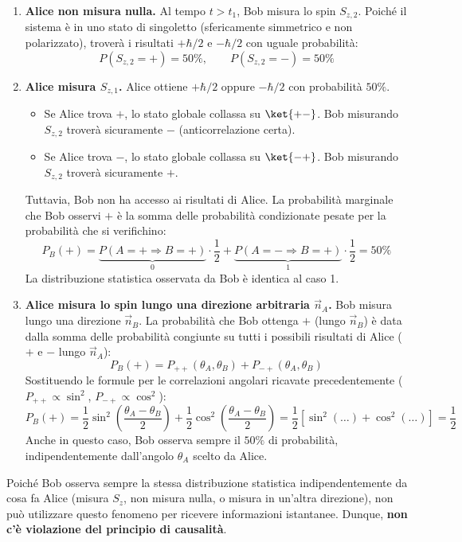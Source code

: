 \begin{enumerate}
    \item \textbf{Alice non misura nulla.}
    Al tempo $t > t_1$, Bob misura lo spin $S_{z,2}$. Poiché il sistema è in uno stato di singoletto (sfericamente simmetrico e non polarizzato), troverà i risultati $+\hbar/2$ e $-\hbar/2$ con uguale probabilità:
    \[
        P(S_{z,2} = +) = 50\%, \qquad P(S_{z,2} = -) = 50\%
    \]

    \item \textbf{Alice misura $S_{z,1}$.}
    Alice ottiene $+\hbar/2$ oppure $-\hbar/2$ con probabilità $50\%$.
    \begin{itemize}
        \item Se Alice trova $+$, lo stato globale collassa su $\ket{+-}$. Bob misurando $S_{z,2}$ troverà sicuramente $-$ (anticorrelazione certa).
        \item Se Alice trova $-$, lo stato globale collassa su $\ket{-+}$. Bob misurando $S_{z,2}$ troverà sicuramente $+$.
    \end{itemize}
    Tuttavia, Bob non ha accesso ai risultati di Alice. La probabilità marginale che Bob osservi $+$ è la somma delle probabilità condizionate pesate per la probabilità che si verifichino:
    \[
        P_B(+) = \underbrace{P(A=+ \Rightarrow B=+)}_{0} \cdot \frac{1}{2} + \underbrace{P(A=- \Rightarrow B=+)}_{1} \cdot \frac{1}{2} = 50\%
    \]
    La distribuzione statistica osservata da Bob è identica al caso 1.

    \item \textbf{Alice misura lo spin lungo una direzione arbitraria $\vec{n}_A$.}
    Bob misura lungo una direzione $\vec{n}_B$.
    La probabilità che Bob ottenga $+$ (lungo $\vec{n}_B$) è data dalla somma delle probabilità congiunte su tutti i possibili risultati di Alice ($+$ e $-$ lungo $\vec{n}_A$):
    \[
        P_B(+) = P_{++}(\theta_A, \theta_B) + P_{-+}(\theta_A, \theta_B)
    \]
    Sostituendo le formule per le correlazioni angolari ricavate precedentemente ($P_{++} \propto \sin^2$, $P_{-+} \propto \cos^2$):
    \[
        P_B(+) = \frac{1}{2} \sin^2\left(\frac{\theta_A - \theta_B}{2}\right) + \frac{1}{2} \cos^2\left(\frac{\theta_A - \theta_B}{2}\right) = \frac{1}{2} \left[ \sin^2(\dots) + \cos^2(\dots) \right] = \frac{1}{2}
    \]
    Anche in questo caso, Bob osserva sempre il $50\%$ di probabilità, indipendentemente dall'angolo $\theta_A$ scelto da Alice.
\end{enumerate}


Poiché Bob osserva sempre la stessa distribuzione statistica indipendentemente da cosa fa Alice (misura $S_z$, non misura nulla, o misura in un'altra direzione), non può utilizzare questo fenomeno per ricevere informazioni istantanee.
Dunque, \textbf{non c'è violazione del principio di causalità}.

